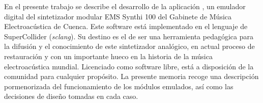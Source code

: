 
En el presente trabajo se describe el desarrollo de la aplicación \appName, un emulador digital del sintetizador modular EMS Synthi 100 del Gabinete de Música Electroacústica de Cuenca. Este software está implementado en el lenguaje de SuperCollider (\textit{sclang}). Su destino es el de ser una herramienta pedagógica para la difusión y el conocimiento de este sintetizador analógico, en actual proceso de restauración y con un importante hueco en la historia de la música electroacústica mundial. Licenciado como software libre, está a disposición de la comunidad para cualquier propósito. La presente memoria recoge una descripción pormenorizada del funcionamiento de los módulos emulados, así como las decisiones de diseño tomadas en cada caso.
\\[1.5cm]
